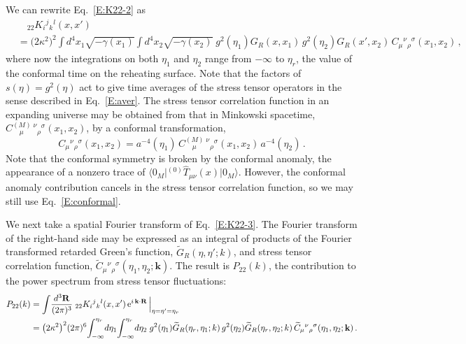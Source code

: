 \documentclass[preprint,prd,showpacs,superscriptaddress]{revtex4}
\begin{document}
We can rewrite Eq.~\eqref{E:K22-2} as
\begin{align}
	&\quad{}_{22}K_{i}{}^{j}{}_{k}{}^{l}(x,x') \nonumber \\
	&=\bigl(2\kappa^{2}\bigr)^{2}\int\!d^{4}x_{1}\sqrt{-\gamma(x_{1})}\int\!d^{4}x_{2}\sqrt{-\gamma(x_{2})}\;
	g^{2}(\eta_{1})G_{R}(x,x_{1})\,g^{2}(\eta_{2})G_{R}(x',x_{2})\,C_{\mu}{}^{\nu}{}_{\rho}{}^{\sigma}(x_{1},x_{2})\,,
\label{E:K22-3}	
\end{align}
where now the integrations on both $\eta_1$ and $\eta_2$ range from $-\infty$ to $\eta_r$, the value of the conformal
time on the reheating surface. Note that the factors of $s(\eta) = g^2(\eta)$ act to give time averages of the stress
tensor operators in the sense described in Eq.~\eqref{E:aver}.
 The stress tensor correlation function in an expanding universe may be obtained
from  that in  Minkowski spacetime, $C^{(M)\;\nu}_{\quad\mu}{}_{\rho}{}^{\sigma}(x_{1},x_{2})$,
by a conformal transformation,
\begin{equation}\label{E:conformal}
	C_{\mu}{}^{\nu}{}_{\rho}{}^{\sigma}(x_{1},x_{2})=
	a^{-4}(\eta_{1})\,C^{(M)\;\nu}_{\quad\mu}{}_{\rho}{}^{\sigma}(x_{1},x_{2})\,a^{-4}(\eta_{2})\,.
\end{equation}
Note that the conformal symmetry is broken by the conformal anomaly, the appearance of a nonzero trace of
$\langle0_{M}\vert{}^{(0)}\hat{T}_{\mu\nu}(x)\vert0_{M}\rangle$. However, the conformal
anomaly contribution cancels in the stress tensor correlation function, so we may still use Eq.~\eqref{E:conformal}.

We next take a spatial Fourier transform of Eq.~\eqref{E:K22-3}. The Fourier transform of the right-hand side may
be expressed as an integral of products of the Fourier transformed retarded Green's function, 
 $\tilde{G}_{R}(\eta,\eta'; {k})$, and stress tensor correlation function, 
 $\widetilde{C}_{\mu}{}^{\nu}{}_{\rho}{}^{\sigma}(\eta_{1},\eta_{2};\mathbf{k})$. The result is $P_{22}({k})$,
 the contribution to the power spectrum from stress tensor fluctuations:
\begin{align}\label{E:P22-0}
	P_{22}({k})&=\int\!\frac{d^{3}\mathbf{R}}{(2\pi)^{3}}\;{}_{22}K_{i}{}^{j}{}_{k}{}^{l}(x,x')\,
	{\rm e}^{i\,\mathbf{k}\cdot\mathbf{R}}\,\Big|_{\eta=\eta'=\eta_{r}}\\
	&=\bigl(2\kappa^{2}\bigr)^{2}(2\pi)^{6}\!\int_{-\infty}^{\eta_{r}}\!d\eta_{1}\!\int_{-\infty}^{\eta_{r}}\!d\eta_{2}\;g^{2}(\eta_{1}) 
	\widetilde{G}_{R}(\eta_{r},\eta_{1};{k})\,g^{2}(\eta_{2})\widetilde{G}_{R}(\eta_{r},\eta_{2};{k})\,
	\widetilde{C}_{\mu}{}^{\nu}{}_{\rho}{}^{\sigma}(\eta_{1},\eta_{2};\mathbf{k})\,.\notag
\end{align}     
\end{document}
